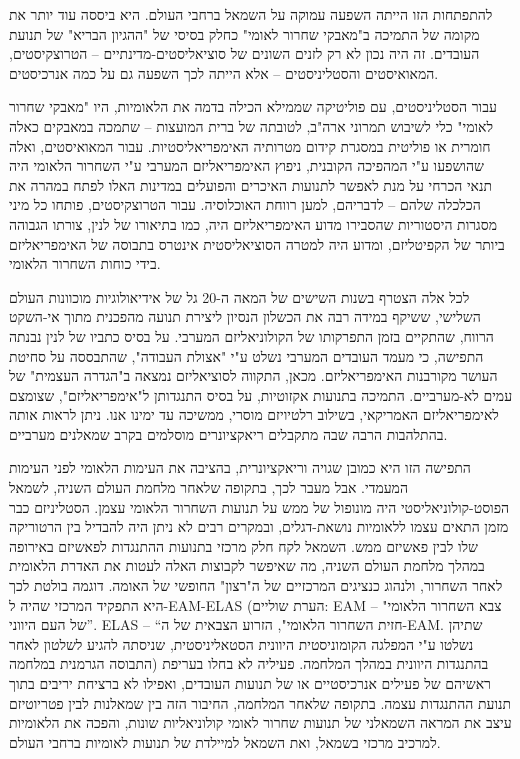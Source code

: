 להתפתחות הזו הייתה השפעה עמוקה על השמאל ברחבי העולם. היא ביססה עוד יותר את מקומה של התמיכה ב"מאבקי שחרור לאומי" כחלק בסיסי של "ההגיון הבריא" של תנועת העובדים. זה היה נכון לא רק לזנים השונים של סוציאליסטים-מדינתיים – הטרוצקיסטים, המאואיסטים והסטליניסטים – אלא הייתה לכך השפעה גם על כמה אנרכיסטים.

עבור הסטליניסטים, עם פוליטיקה שממילא הכילה בדמה את הלאומיות, היו "מאבקי שחרור לאומי" כלי לשיבוש תמרוני ארה"ב, לטובתה של ברית המועצות – שתמכה במאבקים כאלה חומרית או פוליטית במסגרת קידום מטרותיה האימפריאליסטיות. עבור המאואיסטים, ואלה שהושפעו ע"י המהפיכה הקובנית, ניפוץ האימפריאליזם המערבי ע"י השחרור הלאומי היה תנאי הכרחי על מנת לאפשר לתנועות האיכרים והפועלים במדינות האלו לפתח במהרה את הכלכלה שלהם – לדבריהם, למען רווחת האוכלוסיה. עבור הטרוצקיסטים, פותחו כל מיני מסגרות היסטוריות שהסבירו מדוע האימפריאליזם היה, כמו בתיאורו של לנין, צורתו הגבוהה ביותר של הקפיטליזם, ומדוע היה למטרה הסוציאליסטית אינטרס בתבוסה של האימפריאליזם בידי כוחות השחרור הלאומי.

לכל אלה הצטרף בשנות השישים של המאה ה-20 גל של אידיאולוגיות מוכוונות העולם השלישי, ששיקף במידה רבה את הכשלון הנסיון ליצירת תנועה מהפכנית מתוך אי-השקט הרווח, שהתקיים בזמן התפרקותו של הקולוניאליזם המערבי. על בסיס כתביו של לנין נבנתה התפישה, כי מעמד העובדים המערבי נשלט ע"י "אצולת העבודה", שהתבססה על סחיטת העושר מקורבנות האימפריאליזם. מכאן, התקווה לסוציאליזם נמצאה ב"הגדרה העצמית" של עמים לא-מערביים. התמיכה בתנועות אקזוטיות, על בסיס התנגדותן ל"אימפריאליזם", שצומצם לאימפריאליזם האמריקאי, בשילוב רלטיויזם מוסרי, ממשיכה עד ימינו אנו. ניתן לראות אותה בהתלהבות הרבה שבה מתקבלים ריאקציונרים מוסלמים בקרב שמאלנים מערביים.

התפישה הזו היא כמובן שגויה וריאקציונרית, בהציבה את העימות הלאומי לפני העימות המעמדי. אבל מעבר לכך, בתקופה שלאחר מלחמת העולם השניה, לשמאל הפוסט-קולוניאליסטי היה מונופול של ממש על תנועות השחרור הלאומי עצמן. הסטליניזם כבר מזמן התאים עצמו ללאומיות נושאת-דגלים, ובמקרים רבים לא ניתן היה להבדיל בין הרטוריקה שלו לבין פאשיזם ממש. השמאל לקח חלק מרכזי בתנועות ההתנגדות לפאשיזם באירופה במהלך מלחמת העולם השניה, מה שאיפשר לקבוצות האלה לעטות את האדרת הלאומית לאחר השחרור, ולנהוג כנציגים המרכזיים של ה"רצון" החופשי של האומה. דוגמה בולטת לכך היא התפקיד המרכזי שהיה ל-EAM-ELAS (הערת שוליים: EAM – "צבא השחרור הלאומי של העם היווני”. ELAS – “חזית השחרור הלאומי", הזרוע הצבאית של ה-EAM. שתיהן נשלטו ע"י המפלגה הקומוניסטית היוונית הסטאליניסטית, שניסתה להגיע לשלטון לאחר התבוסה הגרמנית במלחמה) בהתנגדות היוונית במהלך המלחמה. פעיליה לא בחלו בעריפת ראשיהם של פעילים אנרכיסטיים או של תנועות העובדים, ואפילו לא ברציחת יריבים בתוך תנועת ההתנגדות עצמה. בתקופה שלאחר המלחמה, החיבור הזה בין שמאלנות לבין פטריוטיזם עיצב את המראה השמאלני של תנועות שחרור לאומי קולוניאליות שונות, והפכה את הלאומיות למרכיב מרכזי בשמאל, ואת השמאל למיילדת של תנועות לאומיות ברחבי העולם.


